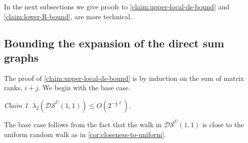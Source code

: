 \documentclass[10pt,a4paper]{article}
\newcommand{\prettyref}[1]{\cref{#1}}
\theoremstyle{definition}
\theoremstyle{remark}
\newtheorem{claim}[theorem]{Claim}
\renewcommand{\leq}{\leqslant}
\numberwithin{equation}{section}
\let\pref=\prettyref
\begin{document}
In the next subsections we give proofs to \pref{claim:upper-local-ds-bound} and \pref{claim:lower-R-bound}, are more technical.
\subsection{Bounding the expansion of the direct sum graphs}
The proof of \pref{claim:upper-local-ds-bound} is by induction on the sum of matrix ranks, \(i+j\). We begin with the base case.
\begin{claim} \label{claim:base-case}
    \(\lambda_2(\mathcal{DS}^U(1,1))\leq O(2^{-\frac{1}{2}\ell})\).
\end{claim}

The base case follows from the fact that the walk in \(\mathcal{DS}^U(1,1)\) is close to the uniform random walk as in \pref{cor:closeness-to-uniform}.
\end{document}
